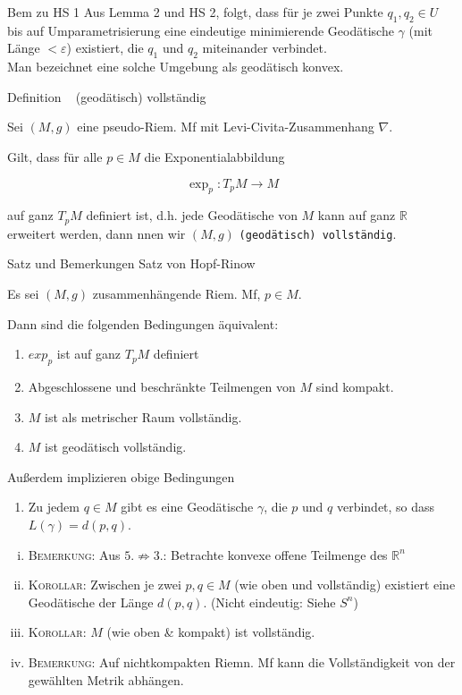 \documentclass[a6paper,11pt,grid=front]{kartei}
\newcommand{\fl}[1]{\begin{flushleft}
 #1 \end{flushleft}}
\newcommand{\R}{\mathbb{R}}
\newcommand{\eps}{\varepsilon}
\newcounter{def}
\newcounter{satz}
\newcommand{\defreset}{\setcounter{def}{1}}
\newcommand{\satzreset}{\setcounter{satz}{1}}
\newcommand{\thisdef}{\thedef\ \stepcounter{def}}
\begin{document}
\nonameyet
{Bem} {zu HS 1}
{
Aus Lemma 2 und HS 2, folgt, dass für je zwei Punkte $q_1, q_2 \in U$ bis auf
Umparametrisierung eine eindeutige minimierende Geodätische $\gamma$ (mit 
Länge $< \eps$) existiert, die $q_1$ und $q_2$ miteinander verbindet.
\\
Man bezeichnet eine solche Umgebung als geodätisch konvex.
}
{}

\defreset
\satzreset
{}


\nonameyet
{Definition \thisdef} {\small (geodätisch) vollständig}
{
	\small
Sei $(M,g)$ eine pseudo-Riem. Mf mit Levi-Civita-Zusammenhang $\nabla$.
\fl{Gilt, dass für alle $p\in M$ die Exponentialabbildung} 
\[
\exp_p : T_pM \to M
\]
\fl{auf ganz $T_pM$ definiert ist, d.h. jede Geodätische von $M$ kann auf 
ganz $\R$ erweitert werden, dann nnen wir $(M,g)$ 
\texttt{(geodätisch) vollständig}.}
}
{}

\nonameyet
{\small Satz und Bemerkungen} {\small Satz von Hopf-Rinow}
{
	\vspace{-2em}
\scriptsize
Es sei $(M,g)$ zusammenhängende Riem. Mf, $p\in M$.
\fl{Dann sind die folgenden Bedingungen äquivalent:}
\begin{enumerate}[1.]
\item $exp_p$ ist auf ganz $T_pM$ definiert
\item Abgeschlossene und beschränkte Teilmengen von $M$ sind kompakt.
\item $M$ ist als metrischer Raum vollständig.
\item $M$ ist geodätisch vollständig.
\end{enumerate}
\fl{Außerdem implizieren obige Bedingungen}
\begin{enumerate}[5.]
\item Zu jedem $q\in M$ gibt es eine Geodätische $\gamma$, die $p$ und $q$
verbindet, so dass $L(\gamma) = d(p,q)$.
\end{enumerate}

\begin{enumerate}[(i)]
\item \textsc{Bemerkung:} Aus $5. \not \Rightarrow 3.$:
Betrachte konvexe offene Teilmenge des $\R^n$
\item \textsc{Korollar:} Zwischen je zwei $p,q \in M$ (wie oben und vollständig)
existiert eine Geodätische der Länge $d(p,q)$. (Nicht eindeutig: Siehe $S^n$)
\item \textsc{Korollar:} $M$ (wie oben \& kompakt) ist vollständig.
\item \textsc{Bemerkung:} Auf nichtkompakten Riemn. Mf kann die Vollständigkeit von der gewählten Metrik abhängen.
\end{enumerate}
}
{}
\end{document}
